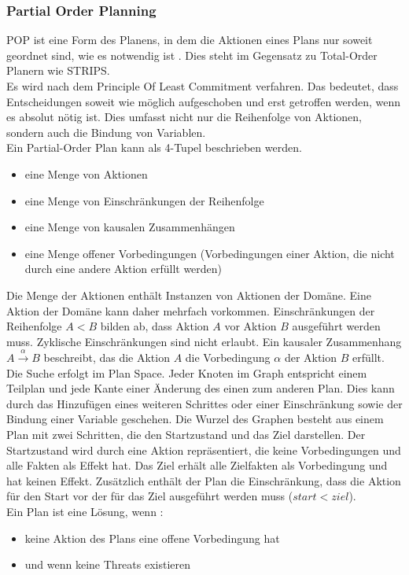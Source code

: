 \subsubsection{Partial Order Planning}
\ac{POP} ist eine Form des Planens, in dem die Aktionen eines Plans nur soweit geordnet sind, wie es notwendig ist \cite{dyer_2003}.
Dies steht im Gegensatz zu Total-Order Planern wie \ac{STRIPS}.\\
Es wird nach dem Principle Of Least Commitment verfahren.
Das bedeutet, dass Entscheidungen soweit wie möglich aufgeschoben und erst getroffen werden, wenn es absolut nötig ist.
Dies umfasst nicht nur die Reihenfolge von Aktionen, sondern auch die Bindung von Variablen.\\
Ein Partial-Order Plan kann als 4-Tupel \cite{grastien} beschrieben werden.
\begin{itemize}
    \item eine Menge von Aktionen
    \item eine Menge von Einschränkungen der Reihenfolge
    \item eine Menge von kausalen Zusammenhängen
    \item eine Menge offener Vorbedingungen (Vorbedingungen einer Aktion, die nicht durch eine andere Aktion erfüllt werden)
\end{itemize}
Die Menge der Aktionen enthält Instanzen von Aktionen der Domäne.
Eine Aktion der Domäne kann daher mehrfach vorkommen.
Einschränkungen der Reihenfolge $A < B$ bilden ab, dass Aktion $A$ vor Aktion $B$ ausgeführt werden muss.
Zyklische Einschränkungen sind nicht erlaubt.
Ein kausaler Zusammenhang $A \xrightarrow{\alpha} B$ beschreibt, das die Aktion $A$ die Vorbedingung $\alpha$ der Aktion $B$ erfüllt.\\
Die Suche erfolgt im Plan Space.
Jeder Knoten im Graph entspricht einem Teilplan und jede Kante einer Änderung des einen zum anderen Plan.
Dies kann durch das Hinzufügen eines weiteren Schrittes oder einer Einschränkung sowie der Bindung einer Variable geschehen.
Die Wurzel des Graphen besteht aus einem Plan mit zwei Schritten, die den Startzustand und das Ziel darstellen.
Der Startzustand wird durch eine Aktion repräsentiert, die keine Vorbedingungen und alle Fakten als Effekt hat.
Das Ziel erhält alle Zielfakten als Vorbedingung und hat keinen Effekt.
Zusätzlich enthält der Plan die Einschränkung, dass die Aktion für den Start vor der für das Ziel ausgeführt werden muss ($start < ziel$).\\
Ein Plan ist eine Lösung, wenn \cite{grastien}:
\begin{itemize}
    \item keine Aktion des Plans eine offene Vorbedingung hat
    \item und wenn keine Threats existieren
\end{itemize}

